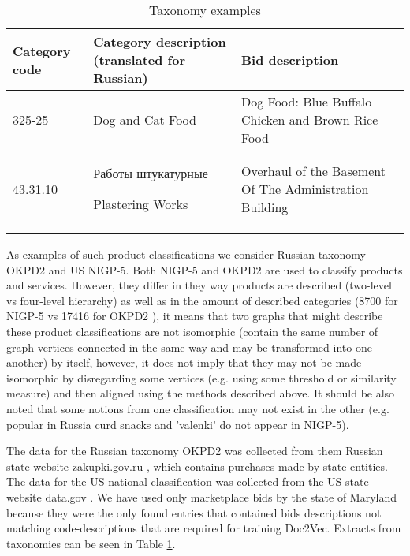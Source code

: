 \documentclass[conference]{IEEEtran}
\begin{document}
\begin{center}
\begin{table}[!htbp]
\caption{Taxonomy examples}
\begin{tabular}{p{1.5cm}|p{3cm}|p{3cm}}
  Category code & Category description \newline (translated for Russian) & Bid description\\
  \hline
  \hline
 325-25 & Dog and Cat Food & Dog Food: Blue Buffalo Chicken and Brown Rice Food\\
  43.31.10 & \begin{russian}Работы штукатурные\end{russian} \newline Plastering Works & Overhaul of the Basement Of The Administration Building\\
\label{table-taxonomies}
\end{tabular}
\end{table}
\end{center}

As examples of such product classifications we consider Russian taxonomy OKPD2 and US NIGP-5.
Both NIGP-5 and OKPD2 are used to classify products and services. However, they differ in they way products are described (two-level vs four-level hierarchy) as well as in the amount of described categories (8700 for NIGP-5 \cite{wiki-nigp} vs 17416 for OKPD2 \cite{wiki-okpd}), it means that two graphs that might describe these product classifications are not isomorphic (contain the same number of graph vertices connected in the same way and may be transformed into one another) by itself, however, it does not imply that they may not be made isomorphic by disregarding some vertices (e.g. using some threshold or similarity measure) and then aligned using the methods described above. It should be also noted that some notions from one classification may not exist in the other (e.g. popular in Russia curd snacks and 'valenki' do not appear in NIGP-5).

The data for the Russian taxonomy OKPD2 was collected from them Russian state website zakupki.gov.ru \cite{gos-zakupki}, which contains purchases made by state entities.
The data for the US national classification was collected from the US state website data.gov \cite{data-gov}. We have used only marketplace bids by the state of Maryland because they were the only found entries that contained bids descriptions not matching code-descriptions that are required for training Doc2Vec. Extracts from taxonomies can be seen in Table \ref{table-taxonomies}.
\end{document}
